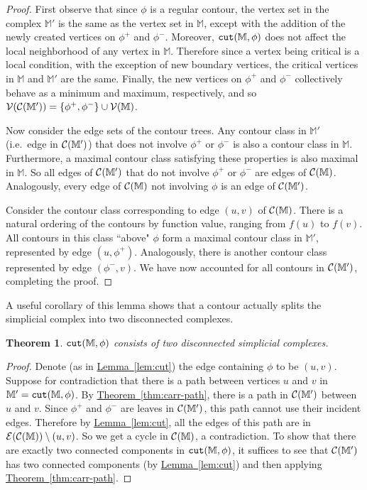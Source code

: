 \documentclass[11pt]{article}
\newtheorem{theorem}{Theorem}[section]
\theoremstyle{definition}
\newcommand{\cC}{{\cal C}}
\newcommand{\cE}{{\cal E}}
\newcommand{\cV}{{\cal V}}
\newcommand{\MM}{\mathbb{M}}
\newcommand{\Thm}[1]{\hyperref[thm:#1]{Theorem~\ref*{thm:#1}}} %
\newcommand{\Lem}[1]{\hyperref[lem:#1]{Lemma~\ref*{lem:#1}}} %
\newcommand{\cut}{{\tt cut}}
\newcommand{\reeb}{\cC}
\begin{document}
\begin{proof} First observe that since $\phi$ is a regular contour, the vertex set in the complex $\MM'$ is the same 
as the vertex set in $\MM$, except with the addition of the newly created vertices on $\phi^+$ and $\phi^-$.  
Moreover, $\cut(\MM,\phi)$ does not affect the local neighborhood of any vertex in $\MM$. 
Therefore since a vertex being critical is a local condition, with the exception of new boundary vertices, the 
critical vertices in $\MM$ and $\MM'$ are the same.  Finally, the new vertices on $\phi^+$ and $\phi^-$ 
collectively behave as a minimum and maximum, respectively, and so $\cV(\reeb(\MM')) = \{\phi^+,\phi^-\} \cup \cV(\MM)$.

Now consider the edge sets of the contour trees.  Any contour class in $\MM'$ (i.e.\ edge in $\cC(\MM')$) that does not involve $\phi^+$ or $\phi^-$ is also
a contour class in $\MM$. Furthermore, a maximal contour class satisfying these properties is also
maximal in $\MM$. So all edges of $\cC(\MM')$ that do not involve $\phi^+$ or $\phi^-$ are edges of $\cC(\MM)$.
Analogously, every edge of $\cC(\MM)$ not involving $\phi$ is an edge of $\cC(\MM')$.

Consider the contour class corresponding to edge $(u,v)$ of $\cC(\MM)$. There is a natural ordering
of the contours by function value, ranging from $f(u)$ to $f(v)$. All contours in this class ``above" $\phi$
form a maximal contour class in $\MM'$, represented by edge $(u,\phi^+)$. Analogously, there is another
contour class represented by edge $(\phi^-,v)$. We have now accounted for all contours in $\cC(\MM')$,
completing the proof.
\end{proof}

A useful corollary of this lemma shows that a contour actually splits the simplicial complex into
two disconnected complexes.

\begin{theorem} \label{thm:jordan} $\cut(\MM,\phi)$ consists of two
disconnected simplicial complexes.
\end{theorem}

\begin{proof} Denote (as in \Lem{cut}) the edge containing $\phi$ to be $(u,v)$. Suppose for contradiction that there is a path between vertices $u$ and $v$
in $\MM' = \cut(\MM,\phi)$. By \Thm{carr-path}, there is a path in $\cC(\MM')$ between $u$ and $v$. Since $\phi^+$ and $\phi^-$
are leaves in $\cC(\MM')$, this path cannot use their incident edges. Therefore by \Lem{cut},
all the edges of this path are in $\cE(\cC(\MM)) \setminus (u,v)$. So we get a cycle in $\cC(\MM)$, a contradiction.
To show that there are exactly two connected components in $\cut(\MM,\phi)$, it suffices
to see that $\cC(\MM')$ has two connected components (by \Lem{cut}) and then applying \Thm{carr-path}.
\end{proof}
\end{document}
